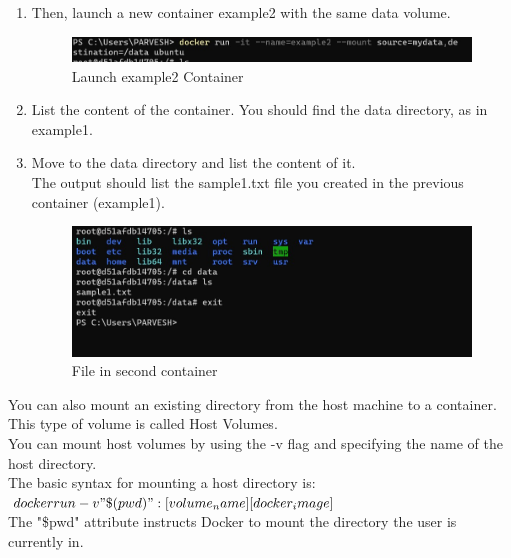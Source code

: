 \documentclass[12pt]{article}
\begin{document}
\begin{enumerate}
\begin{enumerate}
\item Then, launch a new container example2 with the same data volume.

\begin{figure}[H]
\centering
\includegraphics[scale=0.6]{fig48}
\caption{Launch example2 Container}
\vspace{0.6\baselineskip}
\end{figure}

\item List the content of the container. You should find the data directory, as in example1.

\item Move to the data directory and list the content of it.\\
The output should list the sample1.txt file you created in the previous container (example1).\\

\begin{figure}[H]
\centering
\includegraphics[scale=0.6]{fig49}
\caption{File in second container}
\vspace{0.6\baselineskip}
\end{figure}

\end{enumerate}

\end{enumerate}
You can also mount an existing directory from the host machine to a container. This type of volume is called Host Volumes.\\
You can mount host volumes by using the -v flag and specifying the name of the host directory.\\

The basic syntax for mounting a host directory is:\\
$docker run -v "\$(pwd)":[volume_name] [docker_image]$\\

The "\${pwd}" attribute instructs Docker to mount the directory the user is currently in.
\end{document}
